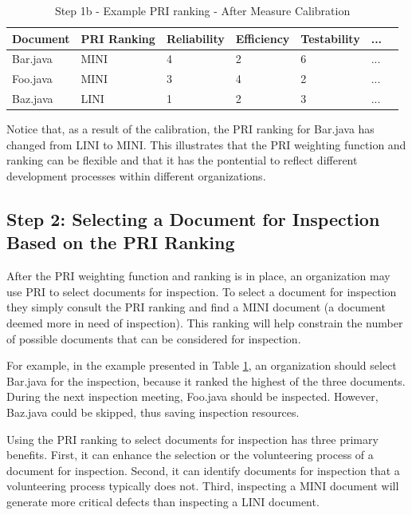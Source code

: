 \label{table:step1b_trial}
\begin{table}[htbp]
  \caption{Step 1b - Example PRI ranking - After Measure Calibration}
  \label{table:step1b}
  \begin{center}
    \begin{tabular}{|l|l|l|l|l|l|l|} \hline
      {\bf Document} & {\bf PRI Ranking} & {\bf Reliability} & 
      {\bf Efficiency} & {\bf Testability} & {\bf ...} \\ \hline
Bar.java & MINI & 4 & 2 & 6 & ...  \\ \hline
Foo.java & MINI & 3 & 4 & 2 & ...  \\ \hline
Baz.java & LINI & 1 & 2 & 3 & ...  \\ \hline
    \end{tabular}
  \end{center}
\end{table}

Notice that, as a result of the calibration, the PRI ranking for Bar.java
has changed from LINI to MINI. This illustrates that the PRI weighting
function and ranking can be flexible and that it has the pontential to
reflect different development processes within different organizations.


\subsection{Step 2: Selecting a Document for Inspection Based on the PRI
  Ranking} After the PRI weighting function and ranking is in place,
an organization may use PRI to select documents for inspection. To select a
document for inspection they simply consult the PRI ranking and find a MINI
document (a document deemed more in need of inspection). This ranking will
help constrain the number of possible documents that can be considered for
inspection.

For example, in the example presented in Table \ref{table:step1b}, an
organization should select Bar.java for the inspection, because it ranked
the highest of the three documents. During the next inspection meeting,
Foo.java should be inspected. However, Baz.java could be skipped, thus
saving inspection resources.

Using the PRI ranking to select documents for inspection has three primary
benefits. First, it can enhance the selection or the volunteering process
of a document for inspection. Second, it can identify documents for
inspection that a volunteering process typically does not. Third,
inspecting a MINI document will generate more critical defects than
inspecting a LINI document.


